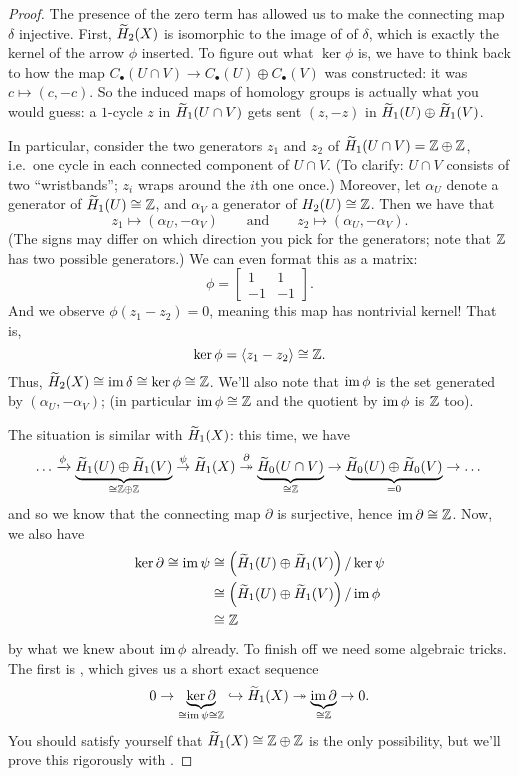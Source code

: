 \begin{proof}
	The presence of the zero term has allowed us to make the connecting map $\delta$ injective.
	First, $\widetilde H_2(X)$ is isomorphic to the image of of $\delta$, which is
	exactly the kernel of the arrow $\phi$ inserted.
	To figure out what $\ker \phi$ is, we have to think back to how the map
	$C_\bullet(U \cap V) \to C_\bullet(U) \oplus C_\bullet(V)$ was constructed:
	it was $c \mapsto (c, -c)$.
	So the induced maps of homology groups is actually what you would guess:
	a $1$-cycle $z$ in $\widetilde H_1(U \cap V)$ gets sent $(z, -z)$ in $\widetilde H_1(U) \oplus \widetilde H_1(V)$.

	In particular, consider the two generators $z_1$ and $z_2$ of
	$\widetilde H_1(U \cap V) = \mathbb Z \oplus \mathbb Z$,
	i.e.\ one cycle in each connected component of $U \cap V$.
	(To clarify: $U \cap V$ consists of two ``wristbands'';
	$z_i$ wraps around the $i$th one once.)
	Moreover, let $\alpha_U$ denote a generator of $\widetilde H_1(U) \cong \mathbb Z$,
	and $\alpha_V$ a generator of $H_2(U) \cong \mathbb Z$.
	Then we have that
	\[ z_1 \mapsto (\alpha_U, -\alpha_V) \qquad\text{and}\qquad z_2 \mapsto (\alpha_U, -\alpha_V). \]
	(The signs may differ on which direction you pick for the generators;
	note that $\mathbb Z$ has two possible generators.)
	We can even format this as a matrix:
	\[ \phi = \begin{bmatrix} 1 & 1 \\ -1 & -1 \end{bmatrix}. \]
	And we observe $\phi(z_1 - z_2) = 0$, meaning this map has nontrivial kernel!
	That is, \[ \ker\phi = \left< z_1 - z_2 \right> \cong \mathbb Z. \]
	Thus, $\widetilde H_2(X) \cong \operatorname{im} \delta \cong \ker \phi \cong \mathbb Z$.
	We'll also note that $\operatorname{im} \phi$ is the set generated by $(\alpha_U, -\alpha_V)$;
	(in particular $\operatorname{im}\phi \cong \mathbb Z$ and the quotient by $\operatorname{im}\phi$ is $\mathbb Z$ too).

	The situation is similar with $\widetilde H_1(X)$: this time, we have
	\[ 
		\dots 
		\xrightarrow{\phi} \underbrace{\widetilde H_1(U) \oplus \widetilde H_1(V)}_{\cong \mathbb Z \oplus \mathbb Z}
		\overset{\psi}{\to} \widetilde H_1(X) \overset\partial{\twoheadrightarrow}
		\underbrace{\widetilde H_0(U \cap V)}_{\cong \mathbb Z} 
		\to \underbrace{\widetilde H_0(U) \oplus \widetilde H_0(V)}_{=0} \to \dots
	\]
	and so we know that the connecting map $\partial$ is surjective,
	hence $\operatorname{im} \partial \cong \mathbb Z$.
	Now, we also have
	\begin{align*}
		\ker \partial \cong \operatorname{im} \psi &\cong \left( \widetilde H_1(U) \oplus \widetilde H_1(V) \right) / \ker \psi \\
		&\cong \left( \widetilde H_1(U) \oplus \widetilde H_1(V) \right) / \operatorname{im} \phi \\
		&\cong \mathbb Z
	\end{align*}
	by what we knew about $\operatorname{im} \phi$ already.
	To finish off we need some algebraic tricks. The first is ,
	which gives us a short exact sequence
	\[
		0 \to \underbrace{\ker\partial}_{\cong \operatorname{im}\psi \cong \mathbb Z} 
		\hookrightarrow \widetilde H_1(X)
		\twoheadrightarrow \underbrace{\operatorname{im}\partial}_{\cong \mathbb Z} \to 0.
	\]
	You should satisfy yourself that $\widetilde H_1(X) \cong \mathbb Z \oplus \mathbb Z$ is the
	only possibility, but we'll prove this rigorously with .
\end{proof}

